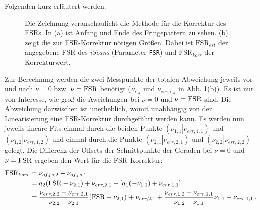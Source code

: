 Folgenden kurz erläutert werden.\par
\begin{figure}[h]
 	\centering
	\caption[\textit{iScan}-FSR-Korrektur -
	Methode]{Die Zeichnung veranschaulicht die Methode für die Korrektur des
	-FSRs. In (a) ist Anfang und Ende des
	Fringepattern zu sehen. (b) zeigt die zur
	FSR-Korrektur nötigen Größen. Dabei ist $\text{FSR}_{est}$ der
	angegebene FSR des \textit{iScans} (Parameter
	\lstinline|FSR|) und $\text{FSR}_{korr}$ der
	Korrekturwert.}\label{fig:FSR-korrektur}
\end{figure}
Zur Berechnung werden die zwei Messpunkte der totalen Abweichung jeweils vor und
nach $\nu=0$ bzw. $\nu=\text{\lstinline|FSR|}$ benötigt ($\nu_{i,j}$ und
$\nu_{err,i,j}$ in Abb. \ref{fig:FSR-korrektur}(b)). Es ist nur von Interesse,
wie groß die Aweichungen bei $\nu=0$ und $\nu=\text{\lstinline|FSR|}$ sind. Die Abweichung dazwischen ist
unerheblich, womit unabhängig von der Linearisierung eine FSR-Korrektur
durchgeführt werden kann. Es werden nun jeweils lineare Fits einmal durch die
beiden Punkte $(\left.\nu_{1,1}\right|\nu_{err,1,1})$ und
$(\left.\nu_{1,2}\right|\nu_{err,1,2})$ und einmal durch die Punkte
$(\left.\nu_{2,1}\right|\nu_{err,2,1})$ und
$(\left.\nu_{2,2}\right|\nu_{err,2,2})$ gelegt.
Die Differenz der Offsets der Schnittpunkte der Geraden bei $\nu=0$ und
$\nu=\text{\lstinline|FSR|}$ ergeben den Wert für die FSR-Korrektur:
\begin{equation}\label{eq:FSR_korrektur}
	\begin{split}
		\text{FSR}_{korr}
		&=\nu_{offs,2}-\nu_{offs,1}\\
		&=a_2(\text{\lstinline|FSR|}-\nu_{2,1})+\nu_{err,2,1}-[a_1(-\nu_{1,1})+\nu_{err,1,1}]\\
		&=\frac{\nu_{err,2,2}-\nu_{err,2,1}}{\nu_{2,2}-\nu_{2,1}}(\text{\lstinline|FSR|}-\nu_{2,1})+\nu_{err,2,1}+\frac{\nu_{err,1,2}-\nu_{err,1,1}}{\nu_{1,2}-\nu_{1,1}}\nu_{1,1}-\nu_{err,1,1}\,.
	\end{split}
\end{equation}
